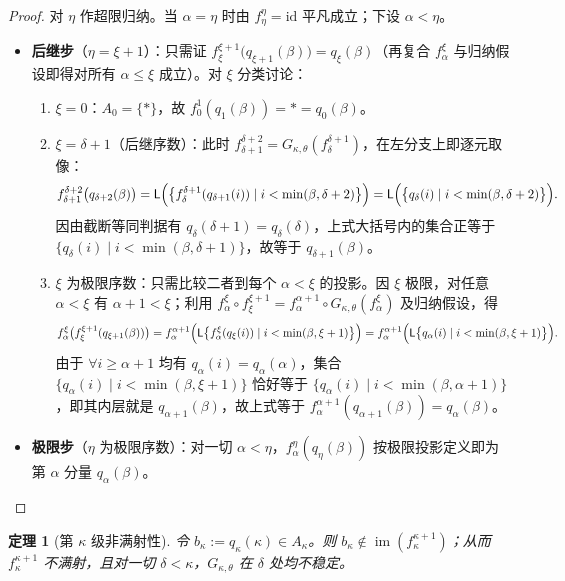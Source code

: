 \documentclass[11pt,a4paper]{ctexart}
\theoremstyle{definition}
\theoremstyle{plain}
\newtheorem{theorem}[definition]{定理}
\newcommand{\im}{\operatorname{im}}
\newcommand{\id}{\mathrm{id}}
\begin{document}
\begin{proof}
对 $\eta$ 作超限归纳。当 $\alpha = \eta$ 时由 $f_\eta^\eta = \id$ 平凡成立；下设 $\alpha < \eta$。
\begin{itemize}[leftmargin=2em]
  \item \textbf{后继步}（$\eta = \xi + 1$）：只需证 $f_\xi^{\xi+1}\bigl(q_{\xi+1}(\beta)\bigr) = q_\xi(\beta)$（再复合 $f_\alpha^\xi$ 与归纳假设即得对所有 $\alpha \le \xi$ 成立）。对 $\xi$ 分类讨论：
    \begin{enumerate}[label=(\roman*)]
      \item $\xi = 0$：$A_0 = \{*\}$，故 $f_0^1(q_1(\beta)) = * = q_0(\beta)$。
      \item $\xi = \delta + 1$（后继序数）：此时 $f_{\delta+1}^{\delta+2} = G_{\kappa,\theta}(f_\delta^{\delta+1})$，在左分支上即逐元取像：
        \[
          f_{\delta+1}^{\delta+2}\bigl(q_{\delta+2}(\beta)\bigr) = \mathsf{L}\Bigl(\bigl\{ f_\delta^{\delta+1}(q_{\delta+1}(i)) \mid i < \min(\beta, \delta+2) \bigr\}\Bigr) = \mathsf{L}\Bigl(\bigl\{ q_\delta(i) \mid i < \min(\beta, \delta+2) \bigr\}\Bigr).
        \]
        因由截断等同判据有 $q_\delta(\delta+1) = q_\delta(\delta)$，上式大括号内的集合正等于 $\{ q_\delta(i) \mid i < \min(\beta, \delta+1) \}$，故等于 $q_{\delta+1}(\beta)$。
      \item $\xi$ 为极限序数：只需比较二者到每个 $\alpha < \xi$ 的投影。因 $\xi$ 极限，对任意 $\alpha < \xi$ 有 $\alpha + 1 < \xi$；利用 $f_\alpha^\xi \circ f_\xi^{\xi+1} = f_\alpha^{\alpha+1} \circ G_{\kappa,\theta}(f_\alpha^\xi)$ 及归纳假设，得
        \[
          f_\alpha^\xi\bigl(f_\xi^{\xi+1}(q_{\xi+1}(\beta))\bigr) = f_\alpha^{\alpha+1}\Bigl(\mathsf{L}\bigl\{ f_\alpha^\xi(q_\xi(i)) \mid i < \min(\beta, \xi+1) \bigr\}\Bigr) = f_\alpha^{\alpha+1}\Bigl(\mathsf{L}\bigl\{ q_\alpha(i) \mid i < \min(\beta, \xi+1) \bigr\}\Bigr).
        \]
        由于 $\forall i \ge \alpha+1$ 均有 $q_\alpha(i) = q_\alpha(\alpha)$，集合 $\{ q_\alpha(i) \mid i < \min(\beta, \xi+1) \}$ 恰好等于 $\{ q_\alpha(i) \mid i < \min(\beta, \alpha+1) \}$，即其内层就是 $q_{\alpha+1}(\beta)$，故上式等于 $f_\alpha^{\alpha+1}(q_{\alpha+1}(\beta)) = q_\alpha(\beta)$。
    \end{enumerate}
  \item \textbf{极限步}（$\eta$ 为极限序数）：对一切 $\alpha < \eta$，$f_\alpha^\eta(q_\eta(\beta))$ 按极限投影定义即为第 $\alpha$ 分量 $q_\alpha(\beta)$。 \qedhere
\end{itemize}
\end{proof}

\begin{theorem}[第 $\kappa$ 级非满射性]
令 $b_\kappa := q_\kappa(\kappa) \in A_\kappa$。则 $b_\kappa \notin \im(f_\kappa^{\kappa+1})$；从而 $f_\kappa^{\kappa+1}$ 不满射，且对一切 $\delta < \kappa$，$G_{\kappa,\theta}$ 在 $\delta$ 处均不稳定。
\end{theorem}
\end{document}
